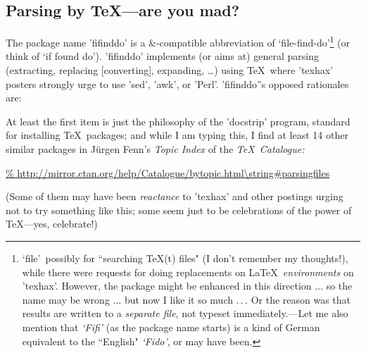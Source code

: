 \documentclass[fleqn]{article}
\begin{document}
\subsection{Parsing by \TeX---are you mad?}
The package name 'fifinddo' is a &\listfiles-compatible abbreviation 
of \lq file-find-do\rq\footnote{\lq file\rq\ possibly for ``searching 
  \TeX(t) files" (I don't remember my thoughts!), 
  while there were requests for doing replacements on 
  \LaTeX\ \emph{environments} on 'texhax'. However, the package might 
  be enhanced in this direction $\dots$ so the name may be wrong 
  $\dots$ but now I like it so much .\,.\,. Or the reason was that 
  results are written to a \emph{separate file}, not typeset 
  immediately.---Let me also mention that \emph{\lq Fifi\rq} (as the 
  package name starts) is a kind of German equivalent to the 
  ``English" \emph{\lq Fido\rq}, or may have been.}
(or think of \lq if found do\rq).
'fifinddo' implements (or aims at) general parsing 
(extracting, replacing [converting], expanding, \dots) 
using \TeX\ where 'texhax' posters strongly urge to use 'sed', 
'awk', or 'Perl'.
'fifinddo''s opposed rationales are: 
%
At least the first item is just the philosophy of the 'docstrip' program, 
standard for installing \TeX\ packages; 
and while I am typing this, I find at least 14 other similar packages 
in J\"urgen Fenn's \emph{Topic Index} of the \emph{\TeX\ Catalogue:}
\begin{center}                      %
  \url{%
    http://mirror.ctan.org/help/Catalogue/bytopic.html\string#parsingfiles}%
\end{center}
(Some of them may have been \emph{reactance} to 'texhax' and other 
postings urging not to try something like this; some seem just to be 
celebrations of the power of \TeX---yes, celebrate!)
\end{document}
